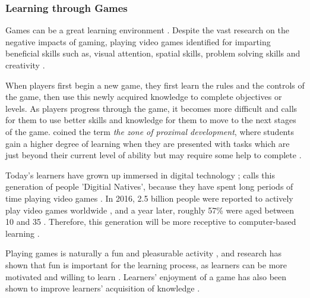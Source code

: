 \documentclass[a4paper,11.5pt]{report}
\numberwithin{figure}{section}
\numberwithin{table}{section}
\numberwithin{equation}{section}
\numberwithin{equation}{section}
\begin{document}


\subsubsection{Learning through Games}


Games can be a great learning environment \citep[see][]{prensky2003, Gee2003}. Despite the vast research on the negative impacts of gaming, playing video games identified for imparting beneficial skills such as, visual attention, spatial skills, problem solving skills and creativity \citep{Granic2014}. 

When players first begin a new game, they first learn the rules and the controls of the game, then use this newly acquired knowledge to complete objectives or levels. As players progress through the game, it becomes more difficult and calls for them to use better skills and knowledge for them to move to the next stages of the game. \citeauthor{vygotsky1978} coined the term \textit{the zone of proximal development}, where students gain a higher degree of learning when they are presented with tasks which are just beyond their current level of ability but may require some help to complete \citep{vygotsky1978}.

Today's learners have grown up immersed in digital technology \citep{Prensky2001}; \citeauthor{Prensky2001} calls this generation of people 'Digitial Natives', because they have spent long periods of time playing video games \citep{prensky2003}. In 2016, 2.5 billion people were reported to actively play video games worldwide \citep{Statista}, and a year later, roughly 57\% were aged between 10 and 35 \citep{Statistanewzoo}. Therefore, this generation will be more receptive to computer-based learning \citep{Girard2013}.

Playing games is naturally a fun and pleasurable activity \citep{Prensky2001}, and research has shown that fun is important for the learning process, as learners can be more motivated and willing to learn \citep{Bisson1996, Cordova1996}. Learners' enjoyment of a game has also been shown to improve learners' acquisition of knowledge \citep{giannakos2013}.
\end{document}
